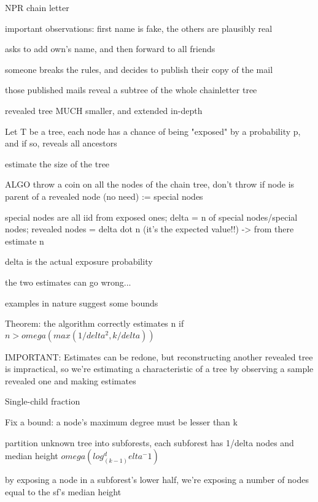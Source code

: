 \documentclass{report}
\begin{document}
	NPR chain letter
	
	important observations: first name is fake, the others are plausibly real
	
	asks to add own's name, and then forward to all friends
	
	
	someone breaks the rules, and decides to publish their copy of the mail
	
	those published mails reveal a subtree of the whole chainletter tree
	
	revealed tree MUCH smaller, and extended in-depth
	
	
	Let T be a tree, each node has a chance of being "exposed" by a probability p, and if so, reveals all ancestors
	
	estimate the size of the tree
	
	ALGO
	throw a coin on all the nodes of the chain tree, don't throw if node is parent of a revealed node (no need) := special nodes
	
	special nodes are all iid from exposed ones; delta = n of special nodes/special nodes; revealed nodes = delta dot n (it's the expected value!!) -> from there estimate n
	
	delta is the actual exposure probability
	
	the two estimates can go wrong...
	
	examples in nature suggest some bounds
	
	
	Theorem: the algorithm correctly estimates n if $n > omega(max(1/delta^2, k/delta))$
	
		
		IMPORTANT: Estimates can be redone, but reconstructing another revealed tree is impractical, so we're estimating a characteristic of  a tree by observing a sample revealed one and making estimates
	
	Single-child fraction
	
	Fix a bound: a node's maximum degree must be lesser than k
	
	partition unknown tree into subforests, each subforest has 1/delta nodes and median height $omega(log_(k-1)^delta^-1)$
	
	by exposing a node in a subforest's lower half, we're exposing a number of nodes equal to the sf's median height
	
	
	
	
\end{document}
